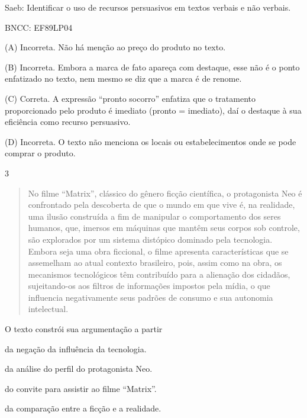 Saeb: Identificar o uso de recursos persuasivos em textos verbais e não
verbais.

BNCC: EF89LP04

(A) Incorreta. Não há menção ao preço do produto no texto.

(B) Incorreta. Embora a marca de fato apareça com destaque, esse não é o
ponto enfatizado no texto, nem mesmo se diz que a marca é de renome.

(C) Correta. A expressão ``pronto socorro'' enfatiza que o tratamento
proporcionado pelo produto é imediato (pronto = imediato), daí o
destaque à sua eficiência como recurso persuasivo.

(D) Incorreta. O texto não menciona os locais ou estabelecimentos onde
se pode comprar o produto.

\num{3}

\begin{quote}
No filme ``Matrix'', clássico do gênero ficção científica, o
protagonista Neo é confrontado pela descoberta de que o mundo em que
vive é, na realidade, uma ilusão construída a fim de manipular o
comportamento dos seres humanos, que, imersos em máquinas que mantêm
seus corpos sob controle, são explorados por um sistema distópico
dominado pela tecnologia. Embora seja uma obra ficcional, o filme
apresenta características que se assemelham ao atual contexto
brasileiro, pois, assim como na obra, os mecanismos tecnológicos têm
contribuído para a alienação dos cidadãos, sujeitando-os aos filtros de
informações impostos pela mídia, o que influencia negativamente seus
padrões de consumo e sua autonomia intelectual.
\end{quote}


O texto constrói sua argumentação a partir

\begin{escolha}
\item da negação da influência da tecnologia.

\item da análise do perfil do protagonista Neo.

\item do convite para assistir ao filme ``Matrix''.

\item da comparação entre a ficção e a realidade.
\end{escolha}

